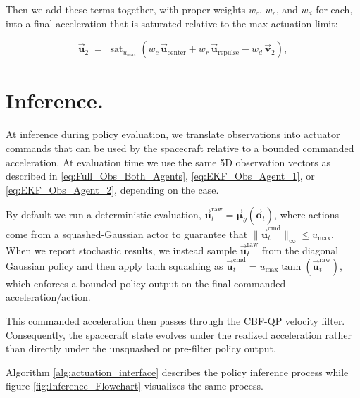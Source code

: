 Then we add these terms together, with proper weights $w_c$, $w_r$, and $w_d$ for each, into a final acceleration that is saturated relative to the max actuation limit:


\[
\boxed{
\vec{\mathbf{u}}_2 \;=\; \operatorname{sat}_{u_{\max}}\!\left(
w_c\,\vec{\mathbf{u}}_{\text{center}} + w_r\,\vec{\mathbf{u}}_{\text{repulse}} - w_d\,\vec{\mathbf{v}}_2\right)},
\]











\section{Inference.}
\label{sec:inference}
At inference during policy evaluation, we translate observations into actuator commands that can be used by the spacecraft relative to a bounded commanded acceleration. At evaluation time we use the same 5D observation vectors as described in \ref{eq:Full_Obs_Both_Agents}, \ref{eq:EKF_Obs_Agent_1}, or \ref{eq:EKF_Obs_Agent_2}, depending on the case.

By default we run a deterministic evaluation, \(\vec{\mathbf{u}}_t^{\mathrm{raw}}=\vec{\boldsymbol{\mu}}_\theta(\vec{\mathbf{o}}_t)\), where actions come from a squashed-Gaussian actor to guarantee that \(\|\vec{\mathbf{u}}_t^{\mathrm{cmd}}\|_\infty \le u_{\max}\). When we report stochastic results, we instead sample \(\vec{\mathbf{u}}_t^{\mathrm{raw}}\) from the diagonal Gaussian policy and then apply tanh squashing as \(\vec{\mathbf{u}}_t^{\mathrm{cmd}}=u_{\max}\tanh\!\left(\vec{\mathbf{u}}_t^{\mathrm{raw}}\right)\), which enforces a bounded policy output on the final commanded acceleration/action.

This commanded acceleration then passes through the CBF-QP velocity filter. Consequently, the spacecraft state evolves under the realized acceleration rather than directly under the unsquashed or pre-filter policy output.

Algorithm \ref{alg:actuation_interface} describes the policy inference process while figure \ref{fig:Inference_Flowchart} visualizes the same process.

